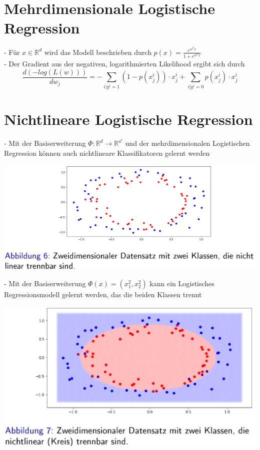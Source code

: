 \documentclass{report}
\begin{document}
  \section{Mehrdimensionale Logistische Regression}	
  - Für $x \in \mathbb{R}^d$ wird das Modell beschrieben durch $p(x) = \frac{e^{w^Tx}}{1 + e^{w^Tx}}$\\	
  - Der Gradient aus der negativen, logarithmierten Likelihood ergibt sich durch	
  $$\frac{d(-log(L(w)))}{dw_j} = -\sum_{i|y^i = 1}(1 - p(x_j^i))\cdot x_j^i + \sum_{i|y^i = 0}p(x_j^i)\cdot x_j^i$$	
  
  \section{Nichtlineare Logistische Regression}	
  - Mit der Basiserweiterung $\Phi: \mathbb{R}^d \rightarrow \mathbb{R^{d'}}$ und der mehrdimensionalen	
  Logistischen Regression können auch nichtlineare Klassifikatoren gelernt werden	
  \begin{center}	
    \includegraphics[scale=.3125]{ml03_5}	
  \end{center}	
  - Mit der Basiserweiterung $\Phi(x) = (x_1^2, x_2^2)$ kann ein Logistisches Regressionsmodell gelernt werden, das die beiden Klassen trennt	
  \begin{center}	
    \includegraphics[scale=.3125]{ml03_6}	
  \end{center}	
  
\end{document}
